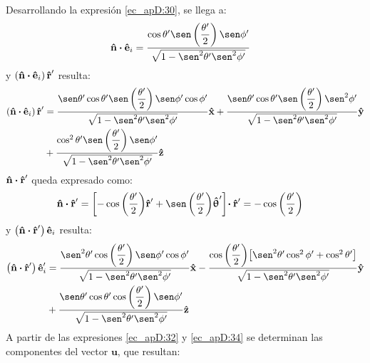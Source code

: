 Desarrollando la expresión \eqref{ec_apD:30}, se llega a:
\begin{align}
\versor{n}\prodesc\versor{e}_i &= \dfrac{\cos\theta '\sen\left(\dfrac{\theta '}{2}\right)\sen\phi '}{\sqrt{1 - \sen^2\theta '\sen^2\phi '}}
\label{ec_apD:31}
\end{align}
y $\left(\bm{\mathbf{\hat{n}}}\boldsymbol{\cdot}\bm{\mathbf{\hat{e}}}_i\right)\bm{\mathbf{\hat{r}}}'$ resulta:
\begin{align}
\begin{split}
\left(\versor{n}\prodesc\versor{e}_i\right)\versor{r}' &= \dfrac{\sen\theta '\cos\theta '\sen\left(\dfrac{\theta '}{2}\right)\sen\phi '\cos\phi '}{\sqrt{1 - \sen^2\theta '\sen^2\phi '}}\versor{x} + \dfrac{\sen\theta '\cos\theta '\sen\left(\dfrac{\theta '}{2}\right)\sen^2\phi '}{\sqrt{1 - \sen^2\theta '\sen^2\phi '}}\versor{y}\\
&+ \dfrac{\cos^2\theta '\sen\left(\dfrac{\theta '}{2}\right)\sen\phi '}{\sqrt{1 - \sen^2\theta '\sen^2\phi '}}\versor{z}
\end{split}
\label{ec_apD:32}
\end{align}
$\bm{\mathbf{\hat{n}}}\boldsymbol{\cdot}\bm{\mathbf{\hat{r}}}'$ queda expresado como:
\begin{align}
\versor{n}\prodesc\versor{r}' &= \left[-\cos\left(\frac{\theta '}{2}\right)\!\versor{r}' + \sen\left(\frac{\theta '}{2}\right)\!\versor{\uptheta}'\right]\!\prodesc\versor{r}' = -\cos\left(\frac{\theta '}{2}\right)
\label{ec_apD:33}
\end{align}
y $\left(\bm{\mathbf{\hat{n}}}\boldsymbol{\cdot}\bm{\mathbf{\hat{r}}}'\right)\bm{\mathbf{\hat{e}}}_i$ resulta:
\begin{align}
\left(\versor{n}\prodesc\versor{r}'\right)\versor{e}_i' &= \dfrac{\sen^2\theta '\cos\left(\dfrac{\theta '}{2}\right)\sen\phi '\cos\phi '}{\sqrt{1 - \sen^2\theta '\sen^2\phi '}}\versor{x} - \dfrac{\cos\left(\dfrac{\theta '}{2}\right)\!\left[\sen^2\theta '\cos^2\phi ' + \cos^2\theta '\right]}{\sqrt{1 - \sen^2\theta '\sen^2\phi '}}\versor{y}\notag\\
&+ \dfrac{\sen\theta '\cos\theta '\cos\left(\dfrac{\theta '}{2}\right)\sen\phi '}{\sqrt{1 - \sen^2\theta '\sen^2\phi '}}\versor{z}
\label{ec_apD:34}
\end{align}
A partir de las expresiones \eqref{ec_apD:32} y \eqref{ec_apD:34} se determinan las componentes del vector $\mathbf{u}$, que resultan:
